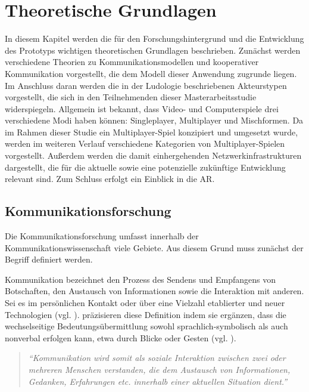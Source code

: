 \chapter{Theoretische Grundlagen}\label{sec:basics}

In diesem Kapitel werden die für den Forschungshintergrund und die Entwicklung des Prototyps wichtigen theoretischen Grundlagen beschrieben.
Zunächst werden verschiedene Theorien zu Kommunikationsmodellen und kooperativer Kommunikation vorgestellt, die dem Modell dieser Anwendung zugrunde liegen.
Im Anschluss daran werden die in der Ludologie beschriebenen Akteurstypen vorgestellt, die sich in den Teilnehmenden dieser Masterarbeitsstudie widerspiegeln.
Allgemein ist bekannt, dass Video- und Computerspiele drei verschiedene Modi haben können: Singleplayer, Multiplayer und Mischformen. Da im Rahmen dieser Studie ein Multiplayer-Spiel konzipiert und umgesetzt wurde, werden im weiteren Verlauf verschiedene Kategorien von Multiplayer-Spielen vorgestellt. Außerdem werden die damit einhergehenden Netzwerkinfrastrukturen dargestellt, die für die aktuelle sowie eine potenzielle zukünftige Entwicklung relevant sind. Zum Schluss erfolgt ein Einblick in die \ac{AR}.

\section{Kommunikationsforschung}

Die Kommunikationsforschung umfasst innerhalb der Kommunikationswissenschaft viele Gebiete. Aus diesem Grund muss zunächst der Begriff  definiert werden.

Kommunikation bezeichnet den Prozess des Sendens und Empfangens von Botschaften, den Austausch von Informationen sowie die Interaktion mit anderen. Sei es im persönlichen Kontakt oder über eine Vielzahl etablierter und neuer Technologien (vgl. \citealp[S. 18]{krcmar_communication_2016}).
\citeauthor{bentele_information_1994} präzisieren diese Definition indem sie ergänzen, dass die wechselseitige Bedeutungsübermittlung sowohl sprachlich-symbolisch als auch nonverbal erfolgen kann, etwa durch Blicke oder Gesten (vgl. \citealp[S. 20]{bentele_information_1994}).

\begin{quote}
\textit{\enquote{Kommunikation wird somit als soziale Interaktion zwischen zwei oder mehreren Menschen verstanden, die dem Austausch von Informationen, Gedanken, Erfahrungen etc. innerhalb einer aktuellen Situation dient.}} \cite[S. 19]{becker_praxishandbuch_2018}
\end{quote}

